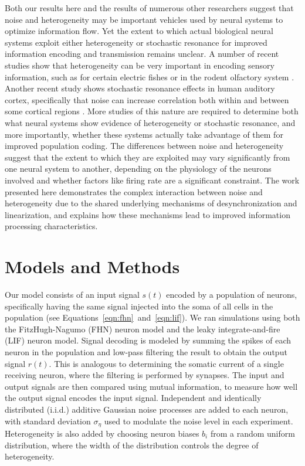 \documentclass[12pt]{article}
\begin{document}
Both our results here and the results of numerous other researchers suggest that noise and heterogeneity may be important vehicles used by neural systems to optimize information flow.
Yet the extent to which actual biological neural systems exploit either heterogeneity or stochastic resonance for improved information encoding and transmission remains unclear.
A number of recent studies show that heterogeneity can be very important in encoding sensory information, such as for certain electric fishes \citep{Marsat2010} or in the rodent olfactory system \citep{Padmanabhan2010,Burton2012}. Another recent study shows stochastic resonance effects in human auditory cortex, specifically that noise can increase correlation both within and between some cortical regions \citep{Ward2010}. More studies of this nature are required to determine both what neural systems show evidence of heterogeneity or stochastic resonance, and more importantly, whether these systems actually take advantage of them for improved population coding.
The differences between noise and heterogeneity suggest that the extent to which they are exploited may vary significantly from one neural system to another, depending on the physiology of the neurons involved and whether factors like firing rate are a significant constraint.
The work presented here demonstrates the complex interaction between noise and heterogeneity due to the shared underlying mechanisms of desynchronization and linearization, and explains how these mechanisms lead to improved information processing characteristics.


\section{Models and Methods}
\label{scn:methods}

Our model consists of an input signal $s(t)$ encoded by a population of neurons, specifically having the same signal injected into the soma of all cells in the population (see Equations~\ref{eqn:fhn}~and~\ref{eqn:lif}). We ran simulations using both the FitzHugh-Nagumo (FHN) neuron model and the leaky integrate-and-fire (LIF) neuron model. Signal decoding is modeled by summing the spikes of each neuron in the population and low-pass filtering the result to obtain the output signal $r(t)$. This is analogous to determining the somatic current of a single receiving neuron, where the filtering is performed by synapses. The input and output signals are then compared using mutual information, to measure how well the output signal encodes the input signal. Independent and identically distributed (i.i.d.) additive Gaussian noise processes are added to each neuron, with standard deviation $\sigma_\eta$ used to modulate the noise level in each experiment. Heterogeneity is also added by choosing neuron biases $b_i$ from a random uniform distribution, where the width of the distribution controls the degree of heterogeneity.
\end{document}
